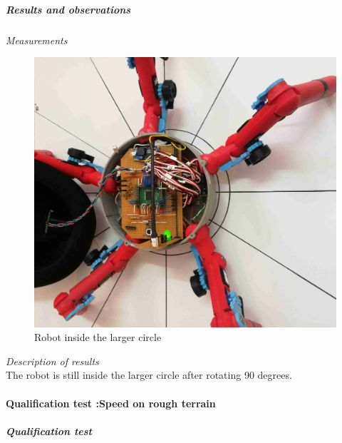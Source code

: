 \subparagraph{Results and observations}
\textit{Measurements}\\
\begin{figure}[H]
\centering
\includegraphics[scale = 1]{pics/Res3.jpg}
\caption{Robot inside the larger circle}
\label{fig:Res3}
\end{figure}
\textit{Description of results}\\
The robot is still inside the larger circle after rotating 90 degrees.

\paragraph{Qualification test  :Speed on rough terrain}
\subparagraph{Qualification test}

